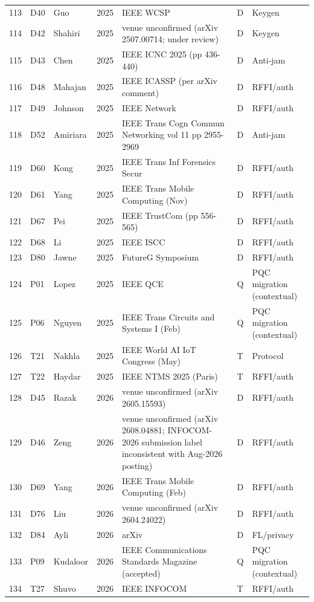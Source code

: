 \documentclass[10.5pt,compsoc,winfonts]{ICN}
\begin{document}
\begin{table}[p]
\begin{tabular}{@{}lllll>{\raggedright\arraybackslash}p{3.3cm}>{\raggedright\arraybackslash}p{1.9cm}@{}}
113 & D40 & Guo & 2025 & IEEE WCSP & D & Keygen \\
114 & D42 & Shahiri & 2025 & venue unconfirmed (arXiv 2507.00714; under review) & D & Keygen \\
115 & D43 & Chen & 2025 & IEEE ICNC 2025 (pp 436-440) & D & Anti-jam \\
116 & D48 & Mahajan & 2025 & IEEE ICASSP (per arXiv comment) & D & RFFI/auth \\
117 & D49 & Johnson & 2025 & IEEE Network & D & RFFI/auth \\
118 & D52 & Amiriara & 2025 & IEEE Trans Cogn Commun Networking vol 11 pp 2955-2969 & D & Anti-jam \\
119 & D60 & Kong & 2025 & IEEE Trans Inf Forensics Secur & D & RFFI/auth \\
120 & D61 & Yang & 2025 & IEEE Trans Mobile Computing (Nov) & D & RFFI/auth \\
121 & D67 & Pei & 2025 & IEEE TrustCom (pp 556-565) & D & RFFI/auth \\
122 & D68 & Li & 2025 & IEEE ISCC & D & RFFI/auth \\
123 & D80 & Jawne & 2025 & FutureG Symposium & D & RFFI/auth \\
124 & P01 & Lopez & 2025 & IEEE QCE & Q & PQC migration (contextual) \\
125 & P06 & Nguyen & 2025 & IEEE Trans Circuits and Systems I (Feb) & Q & PQC migration (contextual) \\
126 & T21 & Nakhla & 2025 & IEEE World AI IoT Congress (May) & T & Protocol \\
127 & T22 & Haydar & 2025 & IEEE NTMS 2025 (Paris) & T & RFFI/auth \\
128 & D45 & Razak & 2026 & venue unconfirmed (arXiv 2605.15593) & D & RFFI/auth \\
129 & D46 & Zeng & 2026 & venue unconfirmed (arXiv 2608.04881; INFOCOM-2026 submission label inconsistent with Aug-2026 posting) & D & RFFI/auth \\
130 & D69 & Yang & 2026 & IEEE Trans Mobile Computing (Feb) & D & RFFI/auth \\
131 & D76 & Liu & 2026 & venue unconfirmed (arXiv 2604.24022) & D & RFFI/auth \\
132 & D84 & Ayli & 2026 & arXiv & D & FL/privacy \\
133 & P09 & Kudaloor & 2026 & IEEE Communications Standards Magazine (accepted) & Q & PQC migration (contextual) \\
134 & T27 & Shuvo & 2026 & IEEE INFOCOM & T & RFFI/auth \\\bottomrule
\end{tabular}
\end{table}
\end{document}
